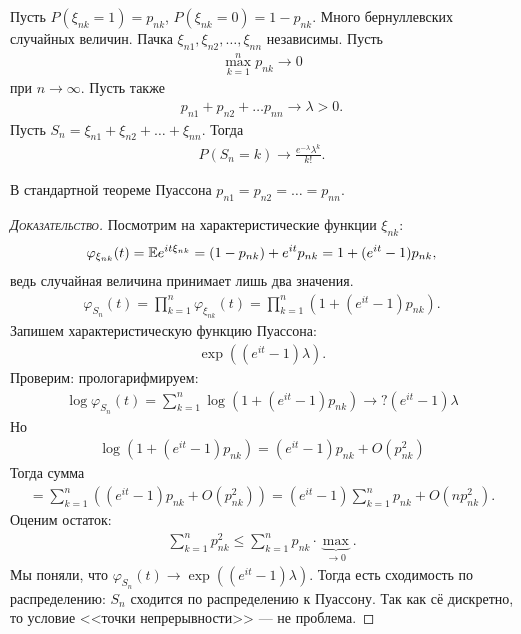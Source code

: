 \documentclass[../main.tex]{subfiles}
\begin{document}
\begin{thm}[Пуассона]
 Пусть $ P(\xi_{nk} = 1) = p_{nk} $, $ P(\xi_{nk} = 0) = 1-p_{nk} $. Много бернуллевских случайных величин. Пачка $ \xi_{n 1}, \xi_{n 2}, \ldots, \xi_{n n} $ независимы. Пусть
 \begin{align*}
  \max_{k=1}^{n} p_{nk} \to 0
 \end{align*} при $ n \to \infty $. Пусть также
 \begin{align*}
  p_{n 1}  + p_{n 2} + \ldots p_{n n} \to \lambda > 0.
 \end{align*} Пусть $ S_n = \xi_{n 1} + \xi_{n 2} + \ldots + \xi_{n n} $. Тогда
 \begin{align*}
  P(S_n = k) \to \frac{e^{-\lambda}\lambda^{k}}{k!}.
 \end{align*}
\end{thm}
В стандартной теореме Пуассона $ p_{n 1} = p_{n 2 } = \ldots = p_{n n} $.
\begin{proof}[\normalfont\textsc{Доказательство}]
 Посмотрим на характеристические функции $ \xi_{n k} $:
 \begin{align*}
  \varphi_{\xi_{n k}}(t) = \mathbb E e^{it \xi_{n k}} = (1 - p_{n k}) + e^{it} p_{n k} = 1 + (e^{it} - 1)p_{n k},
 \end{align*} ведь случайная величина принимает лишь два значения.
 \begin{align*}
  \varphi_{S_n}(t) = \prod_{k=1}^{n} \varphi_{\xi_{n k}}(t) = \prod_{k=1}^{n} (1 + (e^{it} - 1)p_{n k}).
 \end{align*} Запишем характеристическую функцию Пуассона:
 \begin{align*}
  \exp((e^{it} - 1)\lambda).
 \end{align*} Проверим: прологарифмируем:
 \begin{align*}
  \log \varphi_{S_n}(t) = \sum_{k=1}^{n}\log (1 + (e^{it} - 1)p_{nk}) \to ? (e^{it} - 1) \lambda
 \end{align*} Но
 \begin{align*}
  \log(1 + (e^{it} - 1)p_{n k}) = (e^{it} - 1)p_{n k} + O(p_{n k}^{2})
 \end{align*} Тогда сумма
 \begin{align*}
  = \sum_{k=1}^{n} \left( (e^{it}-1)p_{nk} +O(p_{nk}^{2}) \right) = (e^{it} - 1) \sum_{k=1}^{n}p_{nk} + O(np_{nk} ^{ 2}).
 \end{align*} Оценим остаток:
 \begin{align*}
  \sum_{k=1}^{n}p_{nk}^{2} \leqslant \sum_{k=1}^{n} p_{nk} \cdot \underbrace{\max}_{\to 0}.
 \end{align*} Мы поняли, что $ \varphi_{S_n}(t) \to \exp((e^{it}-1)\lambda) $. Тогда есть сходимость по распределению: $ S_n $ сходится по распределению к Пуассону. Так как сё дискретно, то условие <<точки непрерывности>> --- не проблема.
\end{proof}
\end{document}
